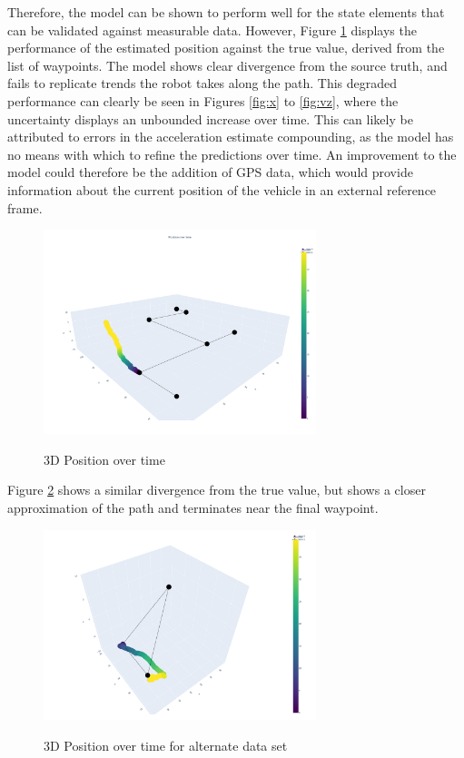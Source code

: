 \documentclass[12pt]{article}
\begin{document}
Therefore, the model can be shown to perform well for the state elements that can be validated against measurable data. However, Figure \ref{fig:pos} displays the performance of the estimated position against the true value, derived from the list of waypoints. The model shows clear divergence from the source truth, and fails to replicate trends the robot takes along the path. This degraded performance can clearly be seen in Figures \ref{fig:x} to \ref{fig:vz}, where the uncertainty displays an unbounded increase over time. This can likely be attributed to errors in the acceleration estimate compounding, as the model has no means with which to refine the predictions over time.  An improvement to the model could therefore be the addition of GPS data, which would provide information about the current position of the vehicle in an external reference frame. 
\begin{figure}[H]
    \centering
    \includegraphics[width=300px]{figures/position.png}\\
    \caption{3D Position over time}
    \label{fig:pos}
\end{figure}

Figure \ref{fig:pos2} shows a similar divergence from the true value, but shows a closer approximation of the path and terminates near the final waypoint. 

\begin{figure}[H]
    \centering
    \includegraphics[width=300px]{figures/path2.png}\\
    \caption{3D Position over time for alternate data set}
    \label{fig:pos2}
\end{figure}
\end{document}
